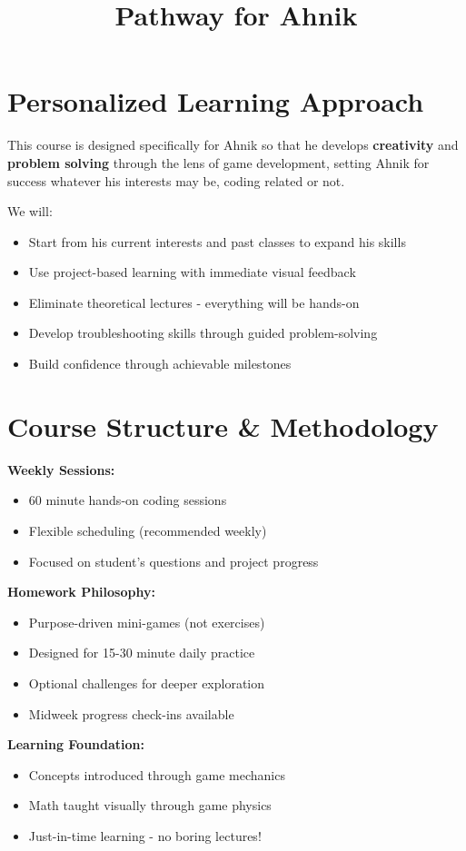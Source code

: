 \documentclass{article}
\title{\vspace{-2em}Pathway for Ahnik\vspace{-2em}}
\author{}
\date{}
\begin{document}
\fontsize{13}{15}\selectfont
\maketitle

\section{Personalized Learning Approach}
This course is designed specifically for Ahnik so that he develops \textbf{creativity} and \textbf{problem solving} through the lens of game development, setting Ahnik for success whatever his interests may be, coding related or not.

We will:

\begin{itemize}[leftmargin=*, noitemsep]
    \item Start from his current interests and past classes to expand his skills
    \item Use project-based learning with immediate visual feedback
    \item Eliminate theoretical lectures - everything will be hands-on
    \item Develop troubleshooting skills through guided problem-solving
    \item Build confidence through achievable milestones
\end{itemize}

\section{Course Structure \& Methodology}
\begin{learningblock}
\textbf{Weekly Sessions:} 
\begin{itemize}[noitemsep]
\item 60 minute hands-on coding sessions 
\item Flexible scheduling (recommended weekly)
\item Focused on student's questions and project progress
\end{itemize}

\textbf{Homework Philosophy:}
\begin{itemize}[noitemsep]
\item Purpose-driven mini-games (not exercises)
\item Designed for 15-30 minute daily practice
\item Optional challenges for deeper exploration
\item Midweek progress check-ins available
\end{itemize}

\textbf{Learning Foundation:}
\begin{itemize}[noitemsep]
\item Concepts introduced through game mechanics
\item Math taught visually through game physics
\item Just-in-time learning - no boring lectures!
\end{itemize}
\end{learningblock}
\end{document}
